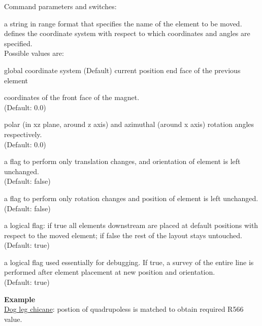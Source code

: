 Command parameters and switches:
\begin{madlist}
    a string in range format that specifies the name of
   the element to be moved. \\   

    defines the coordinate system with respect to which coordinates and
     angles are specified. \\
     Possible values are:       
     \begin{madlist}
          global coordinate system  (Default)
           current position
          end face of the previous element 
     \end{madlist}

    coordinates of the front face of the
   magnet. \\ (Default: 0.0)

    polar (in xz plane, around z axis) and azimuthal (around x axis)
     rotation angles respectively. \\ (Default: 0.0)   
     
    a flag to perform only translation changes, and
   orientation of element is left unchanged. \\ (Default: false)

    a flag to perform only rotation changes and
   position of element is left unchanged. \\ (Default: false)

    a logical flag: if true all elements
   downstream are placed at default positions with respect to the moved
   element; if false the rest of the layout stays untouched. \\    
   (Default: true)

    a logical flag used essentially for debugging.
     If true, a survey of the entire line is performed after element
     placement at new position and orientation. \\
     (Default: true)
\end{madlist}

\textbf{Example }\\
\href{http://cern.ch/frs/mad-X_examples/ptc_madx_interface/eplacement/chicane.madx}{Dog
  leg chicane}: postion of quadrupoless is matched to obtain required
R566 value.   



